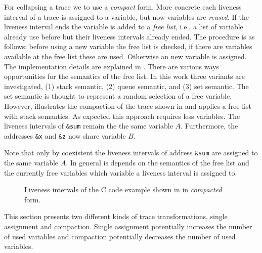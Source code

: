 \documentclass[onecolumn, openright, master, english, signatures]{dbrgrptt}
\begin{document}
For collapsing a \ac{trace} we to use a \emph{compact} form.
More concrete each liveness interval of a \ac{trace} is assigned to a variable, but now variables are \emph{reused}.
If the liveness interval ends the variable is added to a \emph{free list}, i.e., a list of variable already use before but their liveness intervals already ended.
The procedure is as follows: before using a new variable the free list is checked, if there are variables available at the free list these are used.
Otherwise an new variable is assigned.
The implementation details are explained in .
There are various ways opportunities for the semantics of the free list.
In this work three variants are investigated, (1) stack semantic, (2) queue semantic, and (3) set semantic.
The set semantic is thought to represent a random selection of a free variable.
However,  illustrates the compaction of the \ac{trace} shown in  and applies a free list with stack semantics.
As expected this approach requires less variables.
The liveness intervals of \texttt{\&sum} remain the the same variable $A$.
Furthermore, the addresses \texttt{\&x} and \texttt{\&z} now share variable $B$.

\begin{remark}
Note that only by coexistent the liveness intervals of address \texttt{\&sum} are assigned to the same variable $A$.
In general is depends on the semantics of the free list and the currently free variables which variable a liveness interval is assigned to.
\end{remark}

\begin{figure}[!ht]
  \centering
  
  \caption{Liveness intervals of the C code example shown in  in \emph{compacted} form.}
  \label{fig:trace-transformation-compact}
\end{figure}

This section presents two different kinds of \ac{trace} transformations, single assignment and compaction.
Single assignment potentially increases the number of used variables and compaction potentially decreases the number of used variables.

\end{document}
